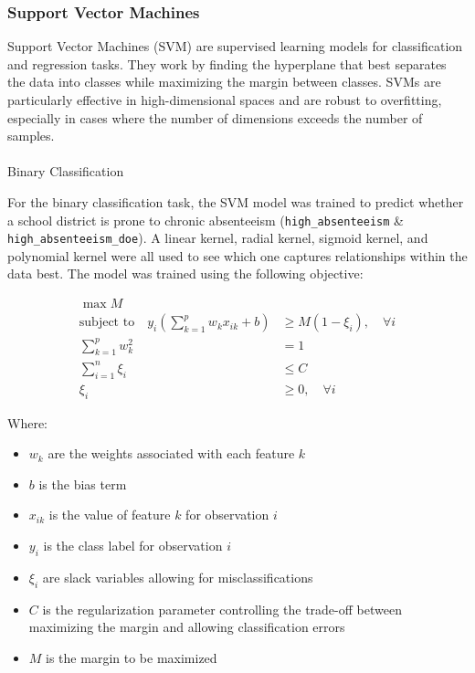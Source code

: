 \documentclass[
  11pt,
]{article}
\makeatletter
\let\oldparagraph\paragraph
\renewcommand{\paragraph}{
    \@ifstar
      \xxxParagraphStar
      \xxxParagraphNoStar
  }
\newcommand{\xxxParagraphStar}[1]{\oldparagraph*{#1}\mbox{}}
\newcommand{\xxxParagraphNoStar}[1]{\oldparagraph{#1}\mbox{}}
\makeatother
\begin{document}
\subsubsection{Support Vector Machines}\label{support-vector-machines}

Support Vector Machines (SVM) are supervised learning models for
classification and regression tasks. They work by finding the hyperplane
that best separates the data into classes while maximizing the margin
between classes. SVMs are particularly effective in high-dimensional
spaces and are robust to overfitting, especially in cases where the
number of dimensions exceeds the number of samples.

\paragraph{Binary Classification}\label{binary-classification-1}

For the binary classification task, the SVM model was trained to predict
whether a school district is prone to chronic absenteeism
(\texttt{high\_absenteeism} \& \texttt{high\_absenteeism\_doe}). A
linear kernel, radial kernel, sigmoid kernel, and polynomial kernel were
all used to see which one captures relationships within the data best.
The model was trained using the following objective:

\[
\begin{aligned}
\max M \\
\text{subject to} \quad 
y_i \left( \sum_{k=1}^{p} w_k x_{ik} + b \right) &\geq M(1 - \xi_i), \quad \forall i \\
\sum_{k=1}^{p} w_k^2 &= 1 \\
\sum_{i=1}^{n} \xi_i &\leq C \\
\xi_i &\geq 0, \quad \forall i
\end{aligned}
\]

Where:

\begin{itemize}
\item
  \(w_k\) are the weights associated with each feature \(k\)
\item
  \(b\) is the bias term
\item
  \(x_{ik}\) is the value of feature \(k\) for observation \(i\)
\item
  \(y_i\) is the class label for observation \(i\)
\item
  \(\xi_i\) are slack variables allowing for misclassifications
\item
  \(C\) is the regularization parameter controlling the trade-off
  between maximizing the margin and allowing classification errors
\item
  \(M\) is the margin to be maximized
\end{itemize}
\end{document}
